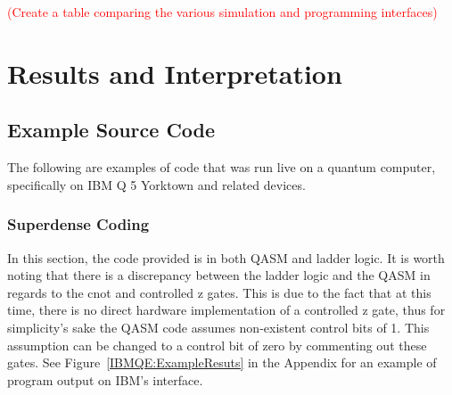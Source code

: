 \documentclass[a4paper]{article}
\begin{document}
\textcolor{red}{(Create a table comparing the various simulation and programming interfaces)} %

\section{Results and Interpretation}%

\subsection{Example Source Code}
The following are examples of code that was run live on a quantum computer, specifically on IBM Q 5 Yorktown and related devices. 
\subsubsection{Superdense Coding}
In this section, the code provided is in both QASM and ladder logic.  It is worth noting that there is a discrepancy between the ladder logic and the QASM in regards to the cnot and controlled z gates.  This is due to the fact that at this time, there is no direct hardware implementation of a controlled z gate, thus for simplicity's sake the QASM code assumes non-existent control bits of 1.  This assumption can be changed to a control bit of zero by commenting out these gates. See Figure~\ref{IBMQE:ExampleResuts} in the Appendix for an example of program output on IBM's interface.

\end{document}
